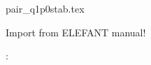 \begin{flushright} {\tiny {\color{gray} pair\_q1p0stab.tex}} \end{flushright}

Import from ELEFANT manual!

\Literature: \cite{sike90,vibo92,kesi92,qizh07,lisi12,chco01,chri02,chke20,eguc03}


